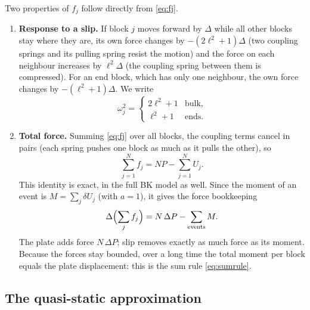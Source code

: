 Two properties of $f_j$ follow directly from \cref{eq:fj}.
\begin{enumerate}
  \item \textbf{Response to a slip.} If block $j$ moves forward by $\Delta$ while all other blocks stay where they are, its own
    force changes by $-(2\ell^2+1)\Delta$ (two coupling springs and its pulling spring resist the motion) and the force on each
    neighbour increases by $\ell^2\Delta$ (the coupling spring between them is compressed). For an end block, which has only one
    neighbour, the own force changes by $-(\ell^2+1)\Delta$. We write
    \begin{equation}
      \omega_j^2 = \begin{cases} 2\ell^2+1 & \text{bulk},\\ \ell^2+1 & \text{ends.}\end{cases}
    \end{equation}
  \item \textbf{Total force.} Summing \cref{eq:fj} over all blocks, the coupling terms cancel in pairs (each spring pushes one
    block as much as it pulls the other), so
    \begin{equation}
      \sum_{j=1}^N f_j = N P - \sum_{j=1}^{N} U_j .
      \label{eq:total-force}
    \end{equation}
    This identity is exact, in the full BK model as well. Since the moment of an event is $M = \sum_j\delta U_j$ (with $a=1$), it
    gives the force bookkeeping
    \begin{equation}
      \Delta\Bigl(\sum_j f_j\Bigr) = N\,\Delta P - \sum_{\text{events}} M .
      \label{eq:force-bookkeeping}
    \end{equation}
    The plate adds force $N\,\Delta P$; slip removes exactly as much force as its moment. Because the forces stay bounded, over a long
    time the total moment per block equals the plate displacement: this is the sum rule \cref{eq:sumrule}.
\end{enumerate}

\subsection{The quasi-static approximation}

